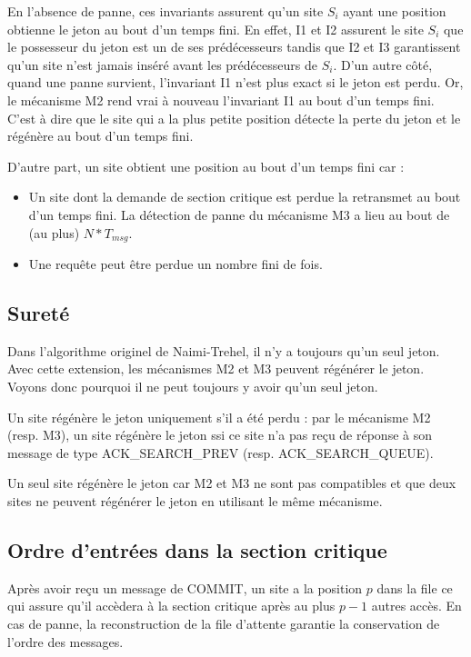En l'absence de panne, ces invariants assurent qu'un site $S_i$ ayant une position obtienne le jeton au bout d'un temps fini. En effet, I1 et I2 assurent le site $S_i$ que le possesseur du jeton est un de ses prédécesseurs tandis que I2 et I3 garantissent qu'un site n'est jamais inséré avant les prédécesseurs de $S_i$. D'un autre côté, quand une panne survient, l'invariant I1 n'est plus exact si le jeton est perdu. Or, le mécanisme M2 rend vrai à nouveau l'invariant I1 au bout d'un temps fini. C'est à dire que le site qui a la plus petite position détecte la perte du jeton et le régénère au bout d'un temps fini.

D'autre part, un site obtient une position au bout d'un temps fini car :

\begin{itemize}
\item Un site dont la demande de section critique est perdue la retransmet au bout d'un temps fini. La détection de panne du mécanisme M3 a lieu au bout de (au plus) $N*T_{msg}$.
\item Une requête peut être perdue un nombre fini de fois.
\end{itemize}


\subsection{Sureté}
Dans l'algorithme originel de Naimi-Trehel, il n'y a toujours qu'un seul jeton. Avec cette extension, les mécanismes M2 et M3 peuvent régénérer le jeton. Voyons donc pourquoi il ne peut toujours y avoir qu'un seul jeton.

Un site régénère le jeton uniquement s'il a été perdu : par le mécanisme M2 (resp. M3), un site régénère le jeton ssi ce site n'a pas reçu de réponse à son message de type ACK\_SEARCH\_PREV (resp. ACK\_SEARCH\_QUEUE).

Un seul site régénère le jeton car M2 et M3 ne sont pas compatibles et que deux sites ne peuvent régénérer le jeton en utilisant le même mécanisme.

\subsection{Ordre d'entrées dans la section critique}
Après avoir reçu un message de COMMIT, un site a la position $p$ dans la file ce qui assure qu'il accèdera à la section critique après au plus $p-1$ autres accès. En cas de panne, la reconstruction de la file d'attente garantie la conservation de l'ordre des messages.

